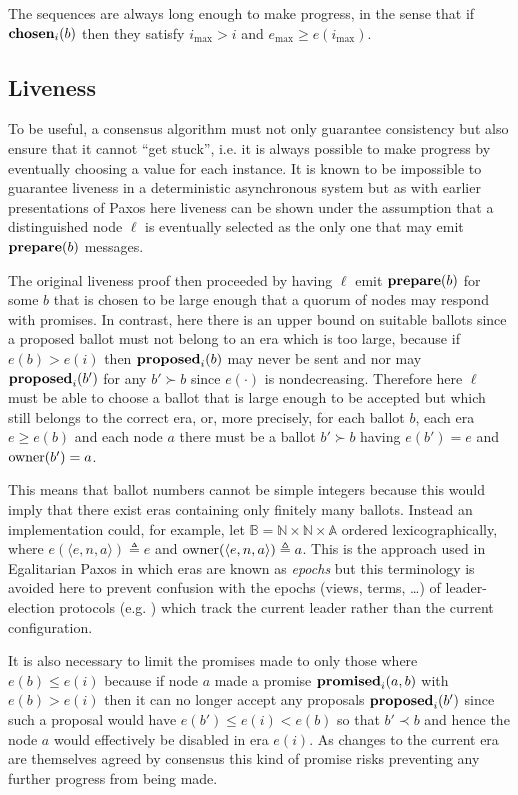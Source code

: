 \documentclass[journal]{IEEEtran}
\begin{document}
The sequences are always long enough to make progress, in the sense that if
$\mathbf{chosen}_{i}(b)$ then they satisfy $i_\mathrm{max} > i$ and $e_\mathrm{max} \ge
e(i_\mathrm{max})$.


\subsection{Liveness}\label{liveness}

To be useful, a consensus algorithm must not only guarantee consistency but
also ensure that it cannot ``get stuck'', i.e. it is always possible to make
progress by eventually choosing a value for each instance. It is known to be
impossible to guarantee liveness in a deterministic asynchronous
system\cite{flp-impossibility} but as with earlier presentations of
Paxos\cite{paxos-made-simple} here liveness can be shown under the assumption
that a distinguished node $\ell$ is eventually selected as the only one that
may emit $\mathbf{prepare}(b)$ messages.

The original liveness proof then proceeded by having $\ell$ emit $\mathbf{prepare}(b)$ for
some $b$ that is chosen to be large enough that a quorum of nodes may respond
with promises. In contrast, here there is an upper bound on suitable ballots
since a proposed ballot must not belong to an era which is too large, because
if ${e(b) > e(i)}$ then $\mathbf{proposed}_{i}(b)$ may never be sent and nor may
$\mathbf{proposed}_{i}(b')$ for any $b' \succ b$ since $e(\cdot)$ is nondecreasing.
Therefore here $\ell$ must be able to choose a ballot that is large enough to
be accepted but which still belongs to the correct era, or, more precisely, for
each ballot $b$, each era $e \ge e(b)$ and each node $a$ there must be a ballot
$b' \succ b$ having $e(b') = e$ and $\mathrm{owner}(b') = a$.

This means that ballot numbers cannot be simple integers because this would
imply that there exist eras containing only finitely many ballots. Instead an
implementation could, for example, let $\mathbb B = \mathbb N \times \mathbb N
\times \mathbb A$ ordered lexicographically, where $e(\langle e, n, a\rangle)
\triangleq e$ and $\mathrm{owner}(\langle e, n, a \rangle) \triangleq a$. This is the
approach used in Egalitarian Paxos\cite{egalitarian-paxos} in which eras are
known as \textit{epochs} but this terminology is avoided here to prevent
confusion with the epochs (views, terms, \ldots) of leader-election protocols
(e.g.  \cite{omega-meets-paxos}) which track the current leader rather than the
current configuration.

It is also necessary to limit the promises made to only those where $e(b) \le
e(i)$ because if node $a$ made a promise $\mathbf{promised}_{i}(a,b)$ with $e(b) > e(i)$
then it can no longer accept any proposals $\mathbf{proposed}_{i}(b')$ since such a proposal
would have $e(b') \le e(i) < e(b)$ so that $b' \prec b$ and hence the node $a$
would effectively be disabled in era $e(i)$. As changes to the current era are
themselves agreed by consensus this kind of promise risks preventing any
further progress from being made.
\end{document}
